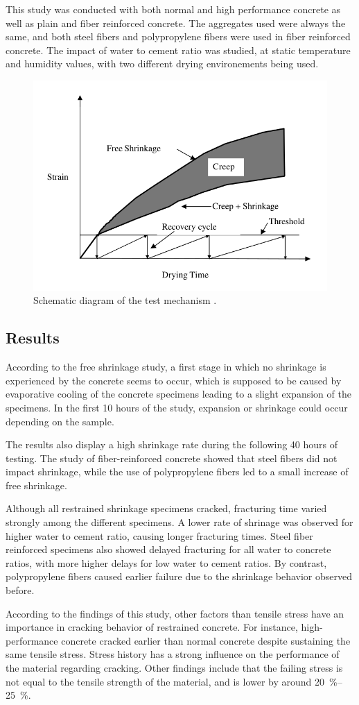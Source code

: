\documentclass{memoir}
\begin{document}
This study was conducted with both normal and high performance concrete as
well as plain and fiber reinforced concrete. The aggregates used were always
the same, and both steel fibers and polypropylene fibers were used in fiber
reinforced concrete. The impact of water to cement ratio was studied, at
static temperature and humidity values, with two different drying environements
being used.

\begin{figure}
  \centering
  \includegraphics[width=.5\linewidth]{aci1}
  \caption{Schematic diagram of the test mechanism \cite{cscea}.}\label{aci1}
\end{figure}

\subsection{Results}
According to the free shrinkage study, a first stage in which no shrinkage is
experienced by the concrete seems to occur, which is supposed to be caused by
evaporative cooling of the concrete specimens leading to a slight expansion of
the specimens. In the first 10 hours of the study, expansion or shrinkage could
occur depending on the sample.

The results also display a high shrinkage rate during the following 40 hours of
testing. The study of fiber-reinforced concrete showed that steel fibers did
not impact shrinkage, while the use of polypropylene fibers led to a small
increase of free shrinkage.

Although all restrained shrinkage specimens cracked, fracturing time varied
strongly among the different specimens. A lower rate of shrinage was observed
for higher water to cement ratio, causing longer fracturing times. Steel
fiber reinforced specimens also showed delayed fracturing for all water to
concrete ratios, with more higher delays for low water to cement ratios. By
contrast, polypropylene fibers caused earlier failure due to the shrinkage
behavior observed before.

According to the findings of this study, other factors than tensile stress have
an importance in cracking behavior of restrained concrete. For instance,
high-performance concrete cracked earlier than normal concrete despite
sustaining the same tensile stress. Stress history has a strong influence on
the performance of the material regarding cracking. Other findings include that
the failing stress is not equal to the tensile strength of the material, and is
lower by around \SIrange{20}{25}{\percent}.
\end{document}
